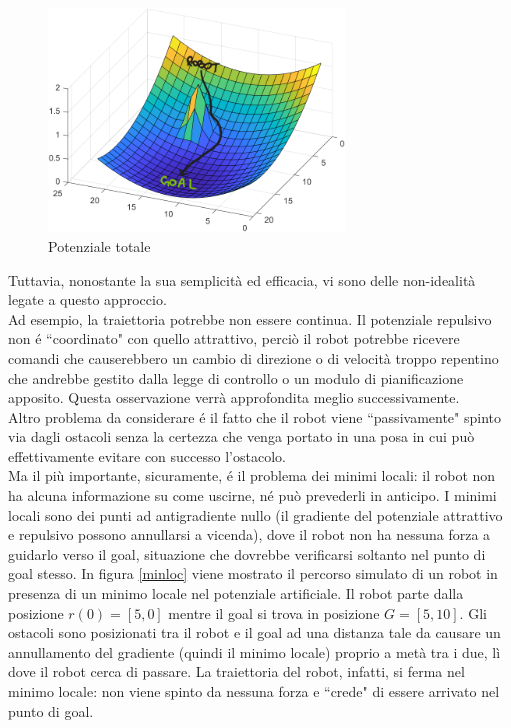 \documentclass[14pt,a4paper]{extarticle}
\begin{document}
\begin{figure}[H]
\centering
\caption{Potenziale totale}
\label{pot}
\includegraphics[width=0.7\textwidth]{pot.png}
\end{figure}
Tuttavia, nonostante la sua semplicità ed efficacia, vi sono delle non-idealità legate a questo approccio.\\
Ad esempio, la traiettoria potrebbe non essere continua. Il potenziale repulsivo non é ``coordinato" con quello attrattivo, perciò il robot potrebbe ricevere comandi che causerebbero un cambio di direzione o di velocità troppo repentino che andrebbe gestito dalla legge di controllo o un modulo di pianificazione apposito. Questa osservazione verrà approfondita meglio successivamente. \\
Altro problema da considerare é il fatto che il robot viene ``passivamente" spinto via dagli ostacoli senza la certezza che venga portato in una posa in cui può effettivamente evitare con successo l'ostacolo.\\
Ma il più importante, sicuramente, é il problema dei minimi locali: il robot non ha alcuna informazione su come uscirne, né può prevederli in anticipo. I minimi locali sono dei punti ad antigradiente nullo (il gradiente del potenziale attrattivo e repulsivo possono annullarsi a vicenda), dove il robot non ha nessuna forza a guidarlo verso il goal, situazione che dovrebbe verificarsi soltanto nel punto di goal stesso. In figura \ref{minloc} viene mostrato il percorso simulato di un robot in presenza di un minimo locale nel potenziale artificiale. Il robot parte dalla posizione \(r(0) = [5,0]\) mentre il goal si trova in posizione \(G = [5,10]\). Gli ostacoli sono posizionati tra il robot e il goal ad una distanza tale da causare un annullamento del gradiente (quindi il minimo locale) proprio a metà tra i due, lì dove il robot cerca di passare. La traiettoria del robot, infatti, si ferma nel minimo locale: non viene spinto da nessuna forza e ``crede" di essere arrivato nel punto di goal.
\end{document}
